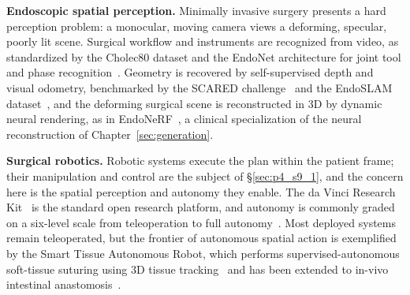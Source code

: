 \textbf{Endoscopic spatial perception.} Minimally invasive surgery presents a hard perception problem: a monocular, moving camera views a deforming, specular, poorly lit scene. 
Surgical workflow and instruments are recognized from video, as standardized by the Cholec80 dataset and the EndoNet architecture for joint tool and phase recognition~\cite{twinanda2017endonet}. 
Geometry is recovered by self-supervised depth and visual odometry, benchmarked by the SCARED challenge~\cite{allan2021scared} and the EndoSLAM dataset~\cite{ozyoruk2021endoslam}, and the deforming surgical scene is reconstructed in 3D by dynamic neural rendering, as in EndoNeRF~\cite{wang2022endonerf}, a clinical specialization of the neural reconstruction of Chapter~\ref{sec:generation}.

\textbf{Surgical robotics.} Robotic systems execute the plan within the patient frame; their manipulation and control are the subject of §\ref{sec:p4_s9_1}, and the concern here is the spatial perception and autonomy they enable. 
The da Vinci Research Kit~\cite{kazanzides2014dvrk} is the standard open research platform, and autonomy is commonly graded on a six-level scale from teleoperation to full autonomy~\cite{yang2017autonomy}. 
Most deployed systems remain teleoperated, but the frontier of autonomous spatial action is exemplified by the Smart Tissue Autonomous Robot, which performs supervised-autonomous soft-tissue suturing using 3D tissue tracking~\cite{shademan2016star} and has been extended to in-vivo intestinal anastomosis~\cite{saeidi2022star}.

